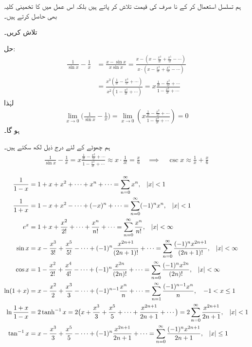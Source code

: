 ہم تسلسل استعمال کر کے نا صرف   کی قیمت تلاش کر پاتے ہیں بلکہ اس عمل میں  کا تخمینی کلیہ بھی حاصل کرتے ہیں۔

 تلاش کریں۔

حل:\quad
\begin{align*}
\frac{1}{\sin x}-\frac{1}{x}&=\frac{x-\sin x}{x\sin x}=\frac{x-(x-\tfrac{x^3}{3!}+\tfrac{x^5}{5!}-\cdots)}{x\cdot(x-\tfrac{x^3}{3!}+\tfrac{x^5}{5!}-\cdots)}\\
&=\frac{x^3(\tfrac{1}{3!}-\tfrac{x^2}{5!}+\cdots)}{x^2(1-\tfrac{x^2}{3!}+\cdots)}=x\frac{\frac{1}{3!}-\frac{x^2}{5!}+\cdots}{1-\frac{x^2}{3!}+\cdots}
\end{align*}
لہٰذا
\begin{align*}
\lim_{x\to 0}\big(\frac{1}{\sin x}-\frac{1}{x}\big)=\lim_{x\to 0}\left(x\frac{\frac{1}{3!}-\frac{x^2}{5!}+\cdots}{1-\frac{x^2}{3!}+\cdots}\right)=0
\end{align*}
ہو گا۔

ہم چھوٹے  کے لئے  درج ذیل لکھ سکتے ہیں۔
\begin{align*}
\frac{1}{\sin x}-\frac{1}{x}=x\frac{\frac{1}{3!}-\frac{x^2}{5!}+\cdots}{1-\frac{x^2}{3!}+\cdots} \approx x\cdot \frac{1}{3!}=\frac{x}{6} \quad \implies \quad \csc x\approx \frac{1}{x}+\frac{x}{6}
\end{align*} 


\begin{align*}
\frac{1}{1-x}&=1+x+x^2+\cdots+x^n+\cdots=\sum_{n=0}^{\infty}x^n,\quad\abs{x}<1\\
\frac{1}{1+x}&=1-x+x^2-\cdots+(-x)^n+\cdots=\sum_{n=0}^{\infty}(-1)^nx^n,\quad\abs{x}<1\\
e^x&=1+x+\frac{x^2}{2!}+\cdots+\frac{x^n}{n!}+\cdots=\sum_{n=0}^{\infty}\frac{x^n}{n!},\quad\abs{x}<\infty\\
\sin x&=x-\frac{x^3}{3!}+\frac{x^5}{5!}-\cdots+(-1)^n\frac{x^{2n+1}}{(2n+1)!}+\cdots=\sum_{n=0}^{\infty}\frac{(-1)^nx^{2n+1}}{(2n+1)!},\quad\abs{x}<\infty\\
\cos x&=1-\frac{x^2}{2!}+\frac{x^4}{4!}-\cdots+(-1)^n\frac{x^{2n}}{(2n)!}+\cdots=\sum_{n=0}^{\infty}\frac{(-1)^nx^{2n}}{(2n)!},\quad\abs{x}<\infty\\
\ln(1+x)&=x-\frac{x^2}{2}+\frac{x^3}{3}-\cdots+(-1)^{n-1}\frac{x^n}{n}+\cdots=\sum_{n=1}^{\infty}\frac{(-1)^{n-1}x^n}{n},\quad-1<x\le 1\\
\ln\frac{1+x}{1-x}&=2\tanh^{-1}x=2\big(x+\frac{x^3}{3}+\frac{x^5}{5}+\cdots+\frac{x^{2n+1}}{2n+1}+\cdots\big)=2\sum_{n=0}^{\infty}\frac{x^{2n+1}}{2n+1},\quad\abs{x}<1\\
\tan^{-1}x&=x-\frac{x^3}{3}+\frac{x^5}{5}-\cdots+(-1)^n\frac{x^{2n+1}}{2n+1}+\cdots=\sum_{n=0}^{\infty}\frac{(-1)^nx^{2n+1}}{2n+1},\quad\abs{x}\le 1
\end{align*}

